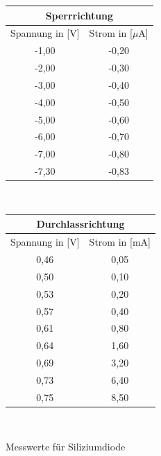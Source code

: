 \documentclass[fontsize=12pt]{scrartcl}
\begin{document}
\begin{figure}[H]
\caption{Messwerte für Siliziumdiode}
\begin{minipage}{0.5\textwidth}
\vspace{-15pt}
\centering
\begin{tabular}{|c|c|} \hline
\multicolumn{2}{|c|}{ Sperrrichtung	}\\ \hline
Spannung in [V]	& Strom in  [$\mu$A] \\ \hline
-1,00	&-0,20\\ \hline
-2,00	&-0,30\\ \hline
-3,00 	&-0,40\\ \hline
-4,00	&-0,50\\ \hline
-5,00	&-0,60\\ \hline
-6,00	&-0,70\\ \hline
-7,00	&-0,80\\ \hline
-7,30	&-0,83\\ \hline
\end{tabular} \\
\end{minipage}
\begin{minipage}{0.2\textwidth}
\centering
\begin{tabular}{|c|c|} \hline
\multicolumn{2}{|c|}{ Durchlassrichtung}	\\ \hline
Spannung in [V]	& Strom in  [mA] \\ \hline
0,46	&0,05\\ \hline
0,50	&0,10\\ \hline
0,53	&0,20\\ \hline
0,57	&0,40\\ \hline
0,61	&0,80\\ \hline
0,64	&1,60\\ \hline
0,69	&3,20\\ \hline
0,73	&6,40\\ \hline
0,75	&8,50\\ \hline
\end{tabular} \\
\end{minipage}
\end{figure}
\vspace{-20pt}	
\end{document}
